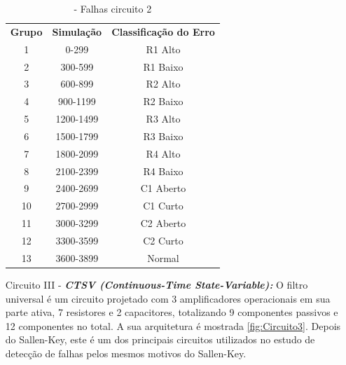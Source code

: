 \begin{enumerate}
 \begin{table}[H]
         \centering
        \begin{tabular}{ccc}
        \textbf{Grupo} & \textbf{Simulação} & \textbf{Classificação do Erro} \\
        1              & 0-299              & R1 Alto                        \\
        2              & 300-599            & R1 Baixo                       \\
        3              & 600-899            & R2 Alto                        \\
        4              & 900-1199           & R2 Baixo                       \\
        5              & 1200-1499          & R3 Alto                        \\
        6              & 1500-1799          & R3 Baixo                       \\
        7              & 1800-2099          & R4 Alto                      \\
        8              & 2100-2399          & R4 Baixo                       \\
        9              & 2400-2699          & C1 Aberto                      \\
        10             & 2700-2999          & C1 Curto                       \\
        11             & 3000-3299          & C2 Aberto                      \\
        12             & 3300-3599          & C2 Curto                       \\
        13             & 3600-3899         & Normal                        
        \end{tabular}
        \caption{\label{tab:falhasckt2}- Falhas circuito 2}
\end{table}

\item[Circuito III - ] 
\textbf{\textit{CTSV (Continuous-Time State-Variable):}} O filtro universal é um circuito projetado com 3 amplificadores operacionais em sua parte ativa, 7 resistores e 2 capacitores, totalizando 9 componentes passivos e 12 componentes no total. A sua arquitetura é mostrada \ref{fig:Circuito3}. Depois do Sallen-Key, este é um dos principais circuitos utilizados no estudo de detecção de falhas pelos mesmos motivos do Sallen-Key. \cite{lombardi} 


\end{enumerate}
